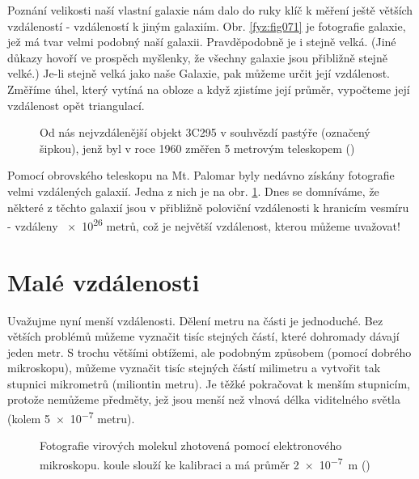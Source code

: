     Poznání velikosti naší vlastní galaxie nám dalo do ruky klíč k měření ještě větších vzdáleností 
    - vzdáleností k jiným galaxiím. Obr. \ref{fyz:fig071} je fotografie galaxie, jež má tvar velmi 
    podobný naší galaxii. Pravděpodobně je i stejně velká. (Jiné důkazy hovoří ve prospěch 
    myšlenky, že všechny galaxie jsou přibližně stejně velké.) Je-li stejně velká jako naše 
    Galaxie, pak můžeme určit její vzdálenost. Změříme úhel, který vytíná na obloze a když zjistíme 
    její průměr, vypočteme její vzdálenost opět triangulací.

    \begin{figure}[ht!]  %
      \centering
      \caption{Od nás nejvzdálenější objekt 3C295 v souhvězdí pastýře (označený šipkou), jenž byl v 
               roce \num{1960} změřen \num{5} metrovým teleskopem (\cite[s.~73]{Feynman01})}
      \label{fyz:fig072}
    \end{figure}
    
    Pomocí obrovského teleskopu na Mt. Palomar byly nedávno získány fotografie velmi vzdálených 
    galaxií. Jedna z nich je na obr. \ref{fyz:fig072}. Dnes se domníváme, že některé z těchto 
    galaxií jsou v přibližně poloviční vzdálenosti k hranicím vesmíru - vzdáleny \num{e26} metrů, 
    což je největší vzdálenost, kterou můžeme uvažovat!
    
  \section{Malé vzdálenosti}
    Uvažujme nyní menší vzdálenosti. Dělení metru na části je jednoduché. Bez větších problémů 
    můžeme vyznačit tisíc stejných částí, které dohromady dávají jeden metr. S trochu většími 
    obtížemi, ale podobným způsobem (pomocí dobrého mikroskopu), můžeme vyznačit tisíc stejných 
    částí milimetru a vytvořit tak stupnici mikrometrů (miliontin metru). Je těžké pokračovat k 
    menším stupnicím, protože nemůžeme  předměty, jež jsou menší než vlnová délka 
    viditelného světla (kolem \num{5e-7} metru).

    \begin{figure}[ht!]  %
      \centering
      \caption{Fotografie virových molekul zhotovená pomocí elektronového mikroskopu.  
               koule slouží ke kalibraci a má průměr \SI{2e-7}{\m}  (\cite[s.~74]{Feynman01})}
      \label{fyz:fig073}
    \end{figure}
    
